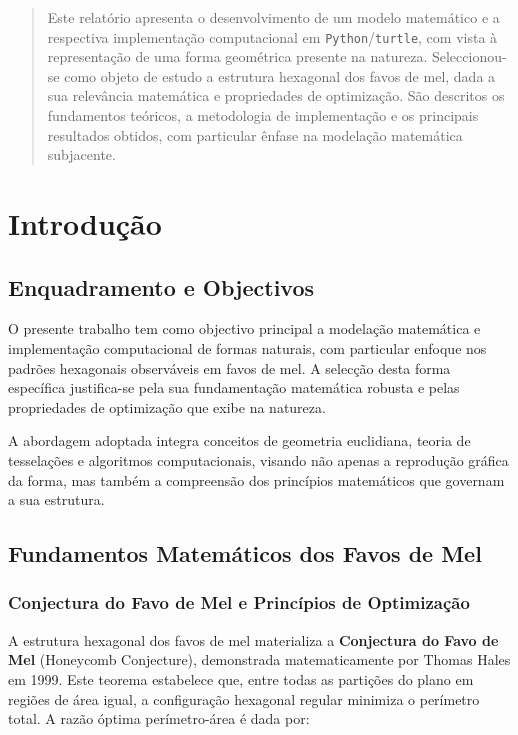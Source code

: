 \documentclass[12pt,a4paper,oneside]{extarticle}
\begin{document}

\begin{abstract}
Este relatório apresenta o desenvolvimento de um modelo matemático e a respectiva implementação computacional em \texttt{Python}/\texttt{turtle}, com vista à representação de uma forma geométrica presente na natureza. Seleccionou-se como objeto de estudo a estrutura hexagonal dos favos de mel, dada a sua relevância matemática e propriedades de optimização. São descritos os fundamentos teóricos, a metodologia de implementação e os principais resultados obtidos, com particular ênfase na modelação matemática subjacente.
\end{abstract}

\section{Introdução}
\subsection{Enquadramento e Objectivos}
O presente trabalho tem como objectivo principal a modelação matemática e implementação computacional de formas naturais, com particular enfoque nos padrões hexagonais observáveis em favos de mel. A selecção desta forma específica justifica-se pela sua fundamentação matemática robusta e pelas propriedades de optimização que exibe na natureza.

A abordagem adoptada integra conceitos de geometria euclidiana, teoria de tesselações e algoritmos computacionais, visando não apenas a reprodução gráfica da forma, mas também a compreensão dos princípios matemáticos que governam a sua estrutura.

\subsection{Fundamentos Matemáticos dos Favos de Mel}

\subsubsection{Conjectura do Favo de Mel e Princípios de Optimização}
A estrutura hexagonal dos favos de mel materializa a \textbf{Conjectura do Favo de Mel} (Honeycomb Conjecture), demonstrada matematicamente por Thomas Hales em 1999. Este teorema estabelece que, entre todas as partições do plano em regiões de área igual, a configuração hexagonal regular minimiza o perímetro total. A razão óptima perímetro-área é dada por:
\end{document}
